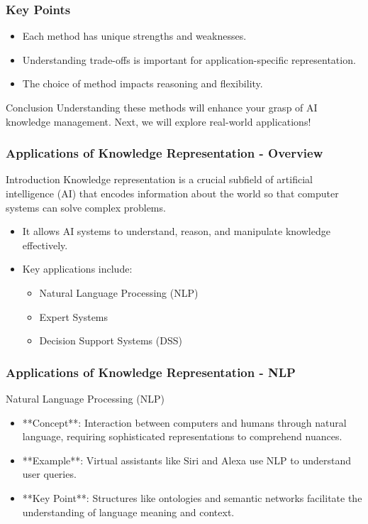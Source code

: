 \documentclass[aspectratio=169]{beamer}
\begin{document}
\begin{frame}[fragile]
    \frametitle{Key Points}
    \begin{itemize}
        \item Each method has unique strengths and weaknesses.
        \item Understanding trade-offs is important for application-specific representation.
        \item The choice of method impacts reasoning and flexibility.
    \end{itemize}
    \begin{block}{Conclusion}
        Understanding these methods will enhance your grasp of AI knowledge management. Next, we will explore real-world applications!
    \end{block}
\end{frame}

\begin{frame}[fragile]
    \frametitle{Applications of Knowledge Representation - Overview}
    \begin{block}{Introduction}
        Knowledge representation is a crucial subfield of artificial intelligence (AI) that encodes information about the world so that computer systems can solve complex problems.
    \end{block}
    
    \begin{itemize}
        \item It allows AI systems to understand, reason, and manipulate knowledge effectively.
        \item Key applications include:
        \begin{itemize}
            \item Natural Language Processing (NLP)
            \item Expert Systems
            \item Decision Support Systems (DSS)
        \end{itemize}
    \end{itemize}
\end{frame}

\begin{frame}[fragile]
    \frametitle{Applications of Knowledge Representation - NLP}
    \begin{block}{Natural Language Processing (NLP)}
        \begin{itemize}
            \item **Concept**: Interaction between computers and humans through natural language, requiring sophisticated representations to comprehend nuances.
            \item **Example**: Virtual assistants like Siri and Alexa use NLP to understand user queries.
            \item **Key Point**: Structures like ontologies and semantic networks facilitate the understanding of language meaning and context.
        \end{itemize}
    \end{block}
\end{frame}
\end{document}
